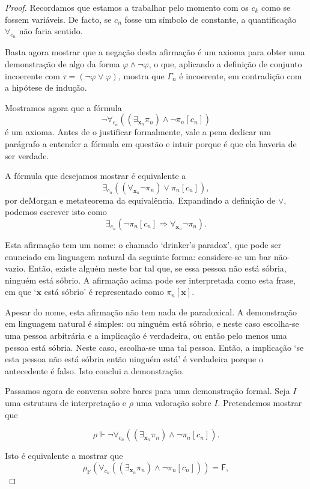 \documentclass{report}
\theoremstyle{definition}
\theoremstyle{remark}
\renewcommand{\bf}[1]{\mathbf{#1}}
\newcommand{\F}{\mathrm{F}}
\newcommand{\lf}{\mathsf{F}}
\newcommand{\imply}{\mathbin{\Rightarrow}}
\begin{document}
\begin{proof}
	Recordamos que estamos a trabalhar pelo momento com os $c_k$ como se fossem variáveis. De facto, se $c_n$ fosse um símbolo de constante, a quantificação $\forall_{c_n}$ não faria sentido.
	
	Basta agora mostrar que a negação desta afirmação é um axioma para obter uma demonstração de algo da forma $\varphi \land \neg \varphi$, o que, aplicando a definição de conjunto incoerente com $\tau = (\neg \varphi \lor \varphi)$, mostra que $\Gamma_n$ é incoerente, em contradição com a hipótese de indução.
	
	Mostramos agora que a fórmula
	\[\neg \forall_{c_n}((\exists_{\bf x_n} \pi_n) \land \neg \pi_n[c_n])\]
	é um axioma. Antes de o justificar formalmente, vale a pena dedicar um parágrafo a entender a fórmula em questão e intuir porque é que ela haveria de ser verdade.
	
	A fórmula que desejamos mostrar é equivalente a
	\[\exists_{c_n}((\forall_{\bf x_n} \neg \pi_n) \lor \pi_n[c_n]),\]
	por deMorgan e metateorema da equivalência. Expandindo a definição de $\lor$, podemos escrever isto como
	\[\exists_{c_n}(\neg \pi_n[c_n] \imply \forall_{\bf x_n} \neg \pi_n).\]
	
	Esta afirmação tem um nome: o chamado `drinker's paradox', que pode ser enunciado em linguagem natural da seguinte forma: considere-se um bar não-vazio. Então, existe alguém neste bar tal que, se essa pessoa não está sóbria, ninguém está sóbrio. A afirmação acima pode ser interpretada como esta frase, em que `$\bf x$ está sóbrio' é representado como $\pi_n[\bf x]$.

Apesar do nome, esta afirmação não tem nada de paradoxical. A demonstração em linguagem natural é simples: ou ninguém está sóbrio, e neste caso escolha-se uma pessoa arbitrária e a implicação é verdadeira, ou então pelo menos uma pessoa está sóbria. Neste caso, escolha-se uma tal pessoa. Então, a implicação `se esta pessoa não está sóbria então ninguém está' é verdadeira porque o antecedente é falso. Isto conclui a demonstração.
	
	Passamos agora de conversa sobre bares para uma demonstração formal. Seja $I$ uma estrutura de interpretação e $\rho$ uma valoração sobre $I$. Pretendemos mostrar que
	
	\[\rho \Vdash \neg \forall_{c_n}((\exists_{\bf x_n} \pi_n) \land \neg \pi_n[c_n]).\]
	
	Isto é equivalente a mostrar que
	\[\rho_\F(\forall_{c_n}((\exists_{\bf x_n} \pi_n) \land \neg \pi_n[c_n])) = \lf,\]
	

\end{proof}
\end{document}
